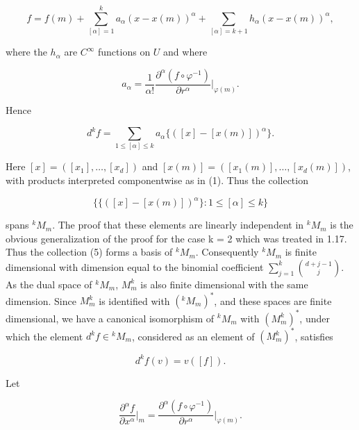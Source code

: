 \begin{equation}
	\tag{2}\label{eq:1.26:2}
	f=f(m)+\sum_{[\alpha]=1}^{k}a_{\alpha}(x-x(m))^{\alpha}+\sum_{[\alpha]=k+1}h_{\alpha}(x-x(m))^{\alpha},
\end{equation}


where the $h_{\alpha}$ are $C^{\infty}$ functions on $U$ and where

\begin{equation}
	\tag{3}\label{eq:1.26:3}
	a_{\alpha}=\frac{1}{\alpha!}\frac{\partial^{\alpha}(f\circ\varphi^{-1})}{\partial r^{\alpha}}\bigg|_{\varphi(m)}.
\end{equation}

Hence

\begin{equation}
	\tag{4}\label{eq:1.26:4}
	d^{k}f=\sum_{1\leq[\alpha]\leq k}a_{\alpha}\{\left([x]-[x(m)]\right)^{\alpha}\}.
\end{equation}

Here $[x]=([x_1],\ldots,[x_d])$ and $[x(m)]=([x_1(m)],\ldots,[x_d(m)])$, with products interpreted componentwise as in (1).
Thus the collection

\begin{equation}
	\tag{5}\label{eq:1.26:5}
	\big\{\{([x]-[x(m)])^{\alpha}\}\colon1\leq[\alpha]\leq k\big\}
\end{equation}

spans  $ ^{k}M_{m} $. The proof that these elements are linearly independent in  $ ^{k}M_{m} $ is the obvious generalization of the proof for the case k = 2 which was treated in 1.17. Thus the collection (5) forms a basis of  $ ^{k}M_{m} $. Consequently  $ ^{k}M_{m} $ is finite dimensional with dimension equal to the binomial coefficient  $ \sum_{j=1}^{k}\binom{d+j-1}{j} $. As the dual space of  $ ^{k}M_{m} $,  $ M_{m}^{k} $ is also finite dimensional with the same dimension. Since  $ M_{m}^{k} $ is identified with  $ (^{k}M_{m})^{*} $, and these spaces are finite dimensional, we have a canonical isomorphism of  $ ^{k}M_{m} $ with  $ (M_{m}^{k})^{*} $, under which the element $d^{k}f \in {}^{k}M_{m}$, considered as an element of  $ (M_{m}^{k})^{*} $, satisfies

\begin{equation}
	\tag{6}\label{eq:1.26:6}
	d^{k}f(v)=v([f]).
\end{equation}

Let

\begin{equation}
	\tag{7}\label{eq:1.26:7}
	\frac{\partial^{\alpha}f}{\partial x^{\alpha}}\bigg|_{m}=\frac{\partial^{\alpha}(f\circ\varphi^{-1})}{\partial r^{\alpha}}\bigg|_{\varphi(m)}.
\end{equation}

